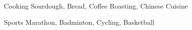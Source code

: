 
\begin{cvskills}

  \cvskill
  {Cooking}
  {Sourdough, Bread, Coffee Roasting, Chinese Cuisine}

  \cvskill
  {Sports}
  {Marathon, Badminton, Cycling, Basketball}

\end{cvskills}

